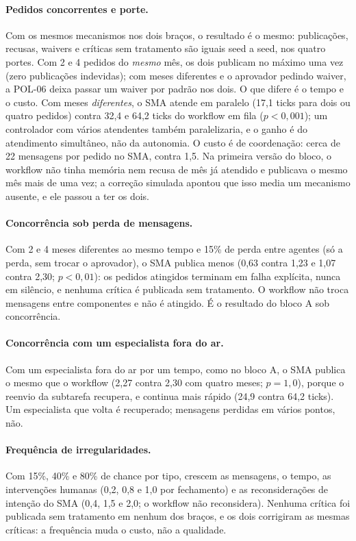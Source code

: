 \documentclass[10pt,a4paper]{article}
\begin{document}
\paragraph{Pedidos concorrentes e porte.} Com os mesmos mecanismos nos dois braços, o resultado é o mesmo:
publicações, recusas, waivers e críticas sem tratamento são iguais seed a seed, nos quatro portes. Com 2 e 4 pedidos do
\emph{mesmo} mês, os dois publicam no máximo uma vez (zero publicações indevidas); com meses diferentes e o aprovador
pedindo waiver, a POL-06 deixa passar um waiver por padrão nos dois. O que difere é o tempo e o custo. Com meses
\emph{diferentes}, o SMA atende em paralelo (17,1 ticks para dois ou quatro pedidos) contra 32,4 e 64,2 ticks do
workflow em fila ($p<0{,}001$); um controlador com vários atendentes também paralelizaria, e o ganho é do
atendimento simultâneo, não da autonomia. O custo é de coordenação: cerca de 22 mensagens por pedido no SMA, contra
1,5. Na primeira versão do bloco, o workflow não tinha memória nem recusa de mês já atendido e publicava o mesmo mês
mais de uma vez; a correção simulada apontou que isso media um mecanismo ausente, e ele passou a ter os dois.

\paragraph{Concorrência sob perda de mensagens.} Com 2 e 4 meses diferentes ao mesmo tempo e 15\% de perda entre
agentes (só a perda, sem trocar o aprovador), o SMA publica menos (0,63 contra 1,23 e 1,07 contra 2,30;
$p<0{,}01$): os pedidos atingidos terminam em falha explícita, nunca em silêncio, e nenhuma crítica é publicada sem
tratamento. O workflow não troca mensagens entre componentes e não é atingido. É o resultado do bloco A sob
concorrência.

\paragraph{Concorrência com um especialista fora do ar.} Com um especialista fora do ar por um tempo, como no
bloco A, o SMA publica o mesmo que o workflow (2,27 contra 2,30 com quatro meses; $p=1{,}0$), porque o reenvio da
subtarefa recupera, e continua mais rápido (24,9 contra 64,2 ticks). Um especialista que volta é recuperado;
mensagens perdidas em vários pontos, não.

\paragraph{Frequência de irregularidades.} Com 15\%, 40\% e 80\% de chance por tipo, crescem as mensagens, o tempo,
as intervenções humanas (0,2, 0,8 e 1,0 por fechamento) e as reconsiderações de intenção do SMA (0,4, 1,5 e 2,0;
o workflow não reconsidera). Nenhuma crítica foi publicada sem tratamento em nenhum dos braços, e os dois corrigiram
as mesmas críticas: a frequência muda o custo, não a qualidade.
\end{document}
